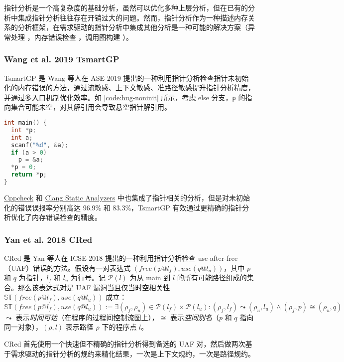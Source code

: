 \renewcommand{\refname}{\small}
\begin{bibunit}

指针分析是一个高复杂度的基础分析，虽然可以优化多种上层分析，但在已有的分析中集成指针分析往往存在开销过大的问题。然而，指针分析作为一种描述内存关系的分析框架，在需求驱动的指针分析中集成其他分析是一种可能的解决方案（异常处理 \cite{bravenboer2009b,kastrinis2013a}，内存错误检查 \cite{yan2018,wang2019}，调用图构建 \cite{smaragdakis2015}）。

\subsubsection{Wang et al. 2019 TsmartGP}

TsmartGP \cite{wang2019} 是 Wang 等人在 ASE 2019 提出的一种利用指针分析检查指针未初始化的内存错误的方法，通过流敏感、上下文敏感、准路径敏感提升指针分析精度，并通过多入口机制优化效率。如 \autoref{code:bug-noninit} 所示，考虑 else 分支，\texttt{p} 的指向集合可能未空，对其解引用会导致悬空指针解引用。

\begin{lstfloat}
\begin{lstlisting}[language={C},caption={指针未初始化错误例子},label={code:bug-noninit}]
int main() {
  int *p;
  int a;
  scanf("%d", &a);
  if (a > 0)
    p = &a;
  *p = 0;
  return *p;
}
\end{lstlisting}
\end{lstfloat}

\href{https://cppcheck.sourceforge.io}{Cppcheck} 和 \href{https://clang-analyzer.llvm.org/available_checks.html}{Clang Static Analyzers} 中也集成了指针相关的分析，但是对未初始化的错误误报率分别高达 96.9\% 和 83.3\%，TsmartGP 有效通过更精确的指针分析优化了内存错误检查的精度。

\subsubsection{Yan et al. 2018 CRed}

CRed \cite{yan2018} 是 Yan 等人在 ICSE 2018 提出的一种利用指针分析检查 use-after-free（UAF）错误的方法。假设有一对表达式 $(free(p@l_f),use(q@l_u))$，其中 $p$ 和 $q$ 为指针，$l_f$ 和 $l_u$ 为行号。记 $\mathcal{P}(l)$ 为从 main 到 $l$ 的所有可能路径组成的集合。那么该表达式对是 UAF 漏洞当且仅当时空相关性 $\mathbb{ST}(free(p@l_f),use(q@l_u))$ 成立：
%
$$
\mathbb{ST}(free(p@l_f),use(q@l_u)) := \exists (\rho_f,\rho_u) \in \mathcal{P}(l_f) \times \mathcal{P}(l_u) : (\rho_f,l_f) \leadsto (\rho_u,l_u) \wedge (\rho_f,p) \cong (\rho_u,q)
$$
%
$\leadsto$ 表示\emph{时间可达}（在程序的过程间控制流图上），$\cong$ 表示\emph{空间别名}（$p$ 和 $q$ 指向同一对象），$(\rho,l)$ 表示路径 $\rho$ 下的程序点 $l$。

CRed 首先使用一个快速但不精确的指针分析得到备选的 UAF 对，然后做两次基于需求驱动的指针分析的规约来精化结果，一次是上下文规约，一次是路径规约。

\small
\putbib[pta]
\end{bibunit}

